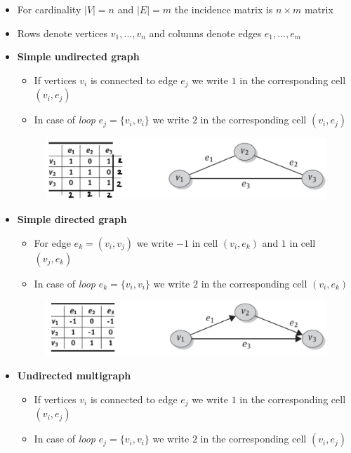 \begin{itemize}
    \item For cardinality \(|V| = n\) and \(|E| = m\) the incidence matrix is \(n \times m\) matrix
    \item Rows denote vertices \(v_1,...,v_n\) and columns denote edges \(e_1,...,e_m\)
    \item \textbf{Simple undirected graph}
    \begin{itemize}
        \item If vertices \(v_i\) is connected to edge \(e_j\) we write \(1\) in the corresponding cell \((v_i, e_j)\)
        \item In case of \textit{loop} \(e_j = \{v_i, v_i\}\) we write \(2\) in the corresponding cell \((v_i, e_j)\)
    \end{itemize}
    
    \begin{figure}[!h]
        \centering
        \includegraphics[width=0.7\linewidth]{images/AdvancedDataManagment/graph_databases/inc_matrix_simple_undirected.jpeg}
        \end{figure}
    
    \item \textbf{Simple directed graph}
    \begin{itemize}
        \item For edge \(e_k = (v_i, v_j)\) we write \(-1\) in cell \((v_i, e_k)\) and \(1\) in cell \((v_j, e_k)\)
        \item In case of \textit{loop} \(e_k = \{v_i, v_i\}\) we write \(2\) in the corresponding cell \((v_i, e_k)\)
    \end{itemize}
    
    \begin{figure}[!h]
        \centering
        \includegraphics[width=0.7\linewidth]{images/AdvancedDataManagment/graph_databases/inc_matrix_simple_directed.jpeg}
        \end{figure}
    
    \item \textbf{Undirected multigraph}
    \begin{itemize}
        \item If vertices \(v_i\) is connected to edge \(e_j\) we write \(1\) in the corresponding cell \((v_i, e_j)\)
        \item In case of \textit{loop} \(e_j = \{v_i, v_i\}\) we write \(2\) in the corresponding cell \((v_i, e_j)\)
    \end{itemize}
    

\end{itemize}
